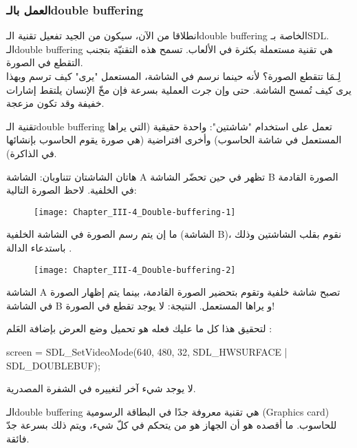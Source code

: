 \subsubsection{العمل بالـ\textenglish{double buffering}}

انطلاقا من الآن، سيكون من الجيد تفعيل تقنية الـ\textenglish{double buffering}
الخاصة بـ\textenglish{SDL}.
الـ\textenglish{double buffering}
هي تقنية مستعملة بكثرة في الألعاب. تسمح هذه التقنيّة بتجنب التقطع في الصورة.\\
لِـمَا تتقطع الصورة؟ لأنه حينما نرسم في الشاشة، المستعمل "يرى" كيف ترسم وبهذا يرى كيف تُمسح الشاشة. حتى وإن جرت العملية بسرعة فإن مخّ الإنسان يلتقط إشارات خفيفة وقد تكون مزعجة.

تقنية الـ\textenglish{double buffering}
تعمل على استخدام "شاشتين": واحدة حقيقية (التي يراها المستعمل في شاشة الحاسوب) وأخرى افتراضية (هي صورة يقوم الحاسوب بإنشائها في الذاكرة).

هاتان الشاشتان تتناوبان: الشاشة
\textenglish{A}
تظهر في حين تحضّر الشاشة
\textenglish{B}
الصورة القادمة في  الخلفية. لاحظ الصورة التالية:

\begin{figure}[H]
	\centering
	\texttt{[image: Chapter\_III-4\_Double-buffering-1]}
\end{figure}

ما إن يتم رسم الصورة في الشاشة الخلفية (الشاشة 
\textenglish{B})،
نقوم بقلب الشاشتين وذلك باستدعاء الدالة
.

\begin{figure}[H]
	\centering
	\texttt{[image: Chapter\_III-4\_Double-buffering-2]}
\end{figure}

الشاشة
\textenglish{A}
تصبح شاشة خلفية وتقوم بتحضير الصورة القادمة، بينما يتم إظهار الصورة في الشاشة
\textenglish{B}
و يراها المستعمل. النتيجة: لا يوجد تقطع في الصورة!

لتحقيق هذا كل ما عليك فعله هو تحميل وضع العرض بإضافة العَلم 
:

\begin{Csource}
screen = SDL_SetVideoMode(640, 480, 32, SDL_HWSURFACE | SDL_DOUBLEBUF);
\end{Csource}

لا يوجد شيء آخر لتغييره في الشفرة المصدرية.

\begin{information}
 الـ\textenglish{double buffering}
هي تقنية معروفة جدًا في البطاقة الرسومية
(\textenglish{Graphics card})
 للحاسوب. ما أقصده هو أن الجهاز هو من يتحكم في كلّ شيء، ويتم ذلك بسرعة جدّ فائقة.
\end{information}

